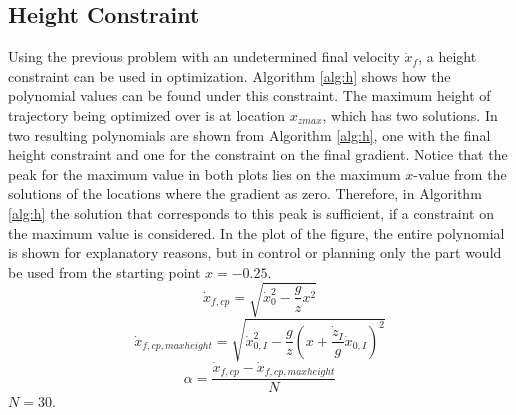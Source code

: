 \subsection{Height Constraint}
Using the previous problem with an undetermined final velocity $\dot{x}_f$, a height constraint can be used in optimization. Algorithm \ref{alg:h} shows how the polynomial values can be found under this constraint. The maximum height of trajectory being optimized over is at location $x_{zmax}$, which has two solutions. In  two resulting polynomials are shown from Algorithm \ref{alg:h}, one with the final height constraint and one for the constraint on the final gradient. Notice that the peak for the maximum value in both plots lies on the maximum $x$-value from the solutions of the locations where the gradient as zero. Therefore, in Algorithm \ref{alg:h} the solution that corresponds to this peak is sufficient, if a constraint on the maximum value is considered. In the plot of the figure, the entire polynomial is shown for explanatory reasons, but in control or planning only the part would be used from the starting point $x=-0.25$.
\begin{equation}
	\dot{x}_{f,cp} = \sqrt{\dot{x}_0^2-\frac{g}{z}x^2}
\end{equation}
\begin{equation}
	\dot{x}_{f,cp,maxheight} = \sqrt{\dot{x}_{0,I}^2-\frac{g}{z}(x+\frac{\dot{z}_I}{g}\dot{x}_{0,I})^2}
\end{equation}
\begin{equation}
	\alpha =\frac{\dot{x}_{f,cp} -\dot{x}_{f,cp,maxheight}}{N}
\end{equation}
$N=30$.

